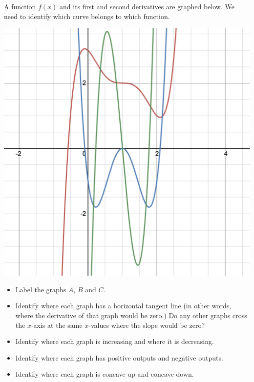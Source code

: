 \documentclass[12pt]{article}
\begin{document}
\begin{enumerate}



\newpage

 A function $f(x)$ and its first and second derivatives are graphed below.  We need to identify which curve belongs to which function.
 
 \begin{multicols}{2}
 \includegraphics[scale=.5]{curvematch1.png}
 
 \begin{itemize}[parsep=.1in]
 \item Label the graphs $A$, $B$ and $C$.
 \item Identify where each graph has a horizontal tangent line (in other words, where the derivative of that graph would be zero.) Do any other graphs cross the $x$-axis at the same $x$-values where the slope would be zero?
 \item Identify where each graph is increasing and where it is decreasing.
\item  Identify where each graph has positive outputs and negative outputs.
\item Identify where each graph is concave up and concave down. 
 \end{itemize}
 
 \end{multicols}


\end{enumerate}
\end{document}
